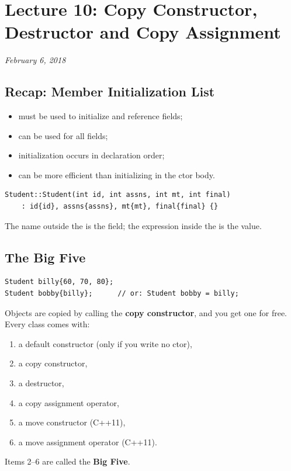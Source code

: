 \chapter{Lecture 10: Copy Constructor, Destructor and Copy Assignment}
\begin{center}
\textit{February 6, 2018}
\end{center}

\section{Recap: Member Initialization List}
\begin{itemize}
  \item must be used to initialize  and reference fields;
  \item can be used for all fields;
  \item initialization occurs in declaration order;
  \item can be more efficient than initializing in the ctor body.
\end{itemize}
\begin{lstlisting}[style=cpp]
Student::Student(int id, int assns, int mt, int final)
    : id{id}, assns{assns}, mt{mt}, final{final} {}
\end{lstlisting}
The name outside the \code{\{\}} is the field; the expression inside the
\code{\{\}} is the value.

\section{The Big Five}
\begin{lstlisting}[style=cpp]
Student billy{60, 70, 80};
Student bobby{billy};      // or: Student bobby = billy;
\end{lstlisting}
Objects are copied by calling the \textbf{copy constructor}, and you get one
for free. Every class comes with:
\begin{enumerate}
  \item a default constructor (only if you write no ctor),
  \item a copy constructor,
  \item a destructor,
  \item a copy assignment operator,
  \item a move constructor (C++11),
  \item a move assignment operator (C++11).
\end{enumerate}
Items 2--6 are called the \textbf{Big Five}.

